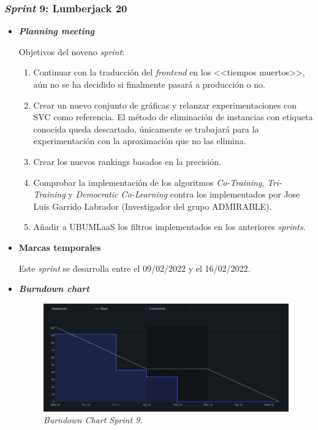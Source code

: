 \subsubsection{\textit{Sprint} 9: Lumberjack 20}
\begin{itemize}
\item \textbf{\textit{Planning meeting}}

Objetivos del noveno \textit{sprint}:
\begin{enumerate}
\item Continuar con la traducción del \textit{frontend} en los <<tiempos muertos>>, aún no se ha decidido si finalmente pasará a producción o no.
\item Crear un nuevo conjunto de gráficas y relanzar experimentaciones con SVC como referencia. El método de eliminación de instancias con etiqueta conocida queda descartado, únicamente se trabajará para la experimentación con la aproximación que no las elimina.
\item Crear los nuevos rankings basados en la precisión. 
\item Comprobar la implementación de los algoritmos \textit{Co-Training}, \textit{Tri-Training} y \textit{Democratic Co-Learning} contra los implementados por Jose Luis Garrido Labrador (Investigador del grupo ADMIRABLE).
\item Añadir a UBUMLaaS los filtros implementados en los anteriores \textit{sprints}.
\end{enumerate}
\item \textbf{Marcas temporales}

Este \textit{sprint} se desarrolla entre el 09/02/2022 y el 16/02/2022.

\item \textbf{\textit{Burndown chart}}
\begin{figure}
\begin{center}
\includegraphics[width=\textwidth]{../img/anexos/sprints/BD-Sprint9}
\caption{\textit{Burndown Chart Sprint 9.}}\label{fig:BD-Sprint9}
\end{center}
\end{figure}


\end{itemize}

